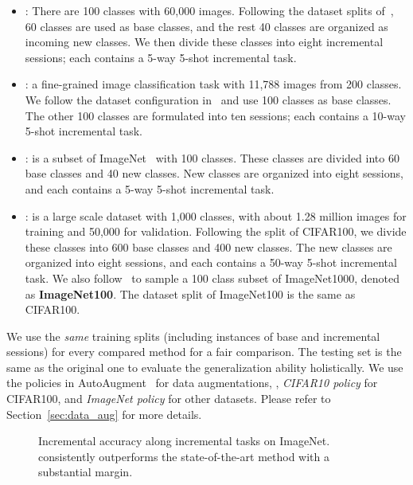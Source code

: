 \begin{itemize}
	\item{  }: There are 100 classes with 60,000 images. 
	Following the dataset splits of~\cite{tao2020few}, 60 classes are used as base classes, and the rest 40 classes are organized as incoming new classes. We then divide these classes into eight incremental sessions; each contains a 5-way 5-shot incremental task.
	
	
	\item {}: a fine-grained image classification task with 11,788 images from 200 classes. We follow the dataset configuration in~\cite{tao2020few} and use 100 classes as base classes. The other 100 classes are formulated into ten sessions; each contains a 10-way 5-shot incremental task.
	
	\item{}:  is a subset of ImageNet~\cite{deng2009imagenet} with 100 classes. 
	These classes are divided into 60 base classes and 40 new classes. New classes are organized into eight sessions, and each contains a 5-way 5-shot incremental task.
	
	\item{}:  is a large scale dataset with 1,000 classes, with about
	1.28 million images for training and 50,000 for validation. Following the split of CIFAR100, we divide these classes into 600 base classes and 400 new classes. The new classes are organized into eight sessions, and each contains a 50-way 5-shot incremental task. We also follow~\cite{yu2020semantic} to sample a 100 class subset of ImageNet1000, denoted as \textbf{ImageNet100}. The dataset split of ImageNet100 is the same as CIFAR100.
	
	
	
\end{itemize}

We use the \emph{same} training splits (including instances of base and incremental sessions) for every compared method for a fair comparison. The testing set is the same as the original one to evaluate the generalization ability holistically. We use the policies in AutoAugment~\cite{cubuk2019autoaugment} for data augmentations, \ie, {\it CIFAR10 policy} for CIFAR100, and {\it ImageNet policy} for other datasets. Please refer to Section~\ref{sec:data_aug} for more details.

\begin{figure}[t]
	\begin{center}
		
	\end{center}
	\caption{ Incremental accuracy along incremental tasks on ImageNet. \name consistently outperforms the state-of-the-art method with a substantial margin.
	} \label{figure:imagenet}
\end{figure}


